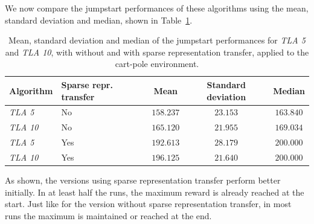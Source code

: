 We now compare the jumpstart performances of these algorithms using the mean, standard deviation and median, shown in Table~\ref{tab:cartpole:sparse:jumpstart:stats}.
\begin{table}[htb]
    \centering
    \begin{tabular}{llccc}
    \hline
    Algorithm & Sparse repr. transfer & Mean & Standard deviation & Median \\
    \hline
       \textit{TLA 5} & No & $158.237$ & $23.153$ & $163.840$ \\
       \textit{TLA 10} & No & $165.120$ & $21.955$ & $169.034$ \\
       \textit{TLA 5} & Yes & $192.613$ & $28.179$ & $\bm{200.000}$ \\
       \textit{TLA 10} & Yes & $\bm{196.125}$ & $21.640$ & $\bm{200.000}$ \\
    \hline
    \end{tabular}
    \caption{Mean, standard deviation and median of the jumpstart performances for \textit{TLA 5} and \textit{TLA 10}, with without and with sparse representation transfer, applied to the cart-pole environment.}
    \label{tab:cartpole:sparse:jumpstart:stats}
\end{table}
As shown, the versions using sparse representation transfer perform better initially. In at least half the runs, the maximum reward is already reached at the start. Just like for the version without sparse representation transfer, in most runs the maximum is maintained or reached at the end.

